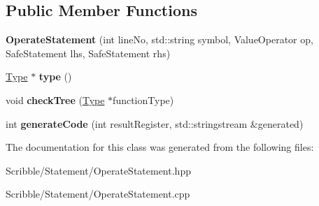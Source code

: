 \subsection*{Public Member Functions}
\begin{DoxyCompactItemize}
\item 
\hypertarget{class_operate_statement_a850e8e5d58fcb6eb679964d77e1b0efc}{{\bfseries Operate\-Statement} (int line\-No, std\-::string symbol, Value\-Operator op, Safe\-Statement lhs, Safe\-Statement rhs)}\label{class_operate_statement_a850e8e5d58fcb6eb679964d77e1b0efc}

\item 
\hypertarget{class_operate_statement_a70829f6c2c259ecb90e04334fc084173}{\hyperlink{class_type}{Type} $\ast$ {\bfseries type} ()}\label{class_operate_statement_a70829f6c2c259ecb90e04334fc084173}

\item 
\hypertarget{class_operate_statement_a690aba01823c509664d6cf1cb4bc0b14}{void {\bfseries check\-Tree} (\hyperlink{class_type}{Type} $\ast$function\-Type)}\label{class_operate_statement_a690aba01823c509664d6cf1cb4bc0b14}

\item 
\hypertarget{class_operate_statement_ae2403856c0521666a2318bd80c8f3a09}{int {\bfseries generate\-Code} (int result\-Register, std\-::stringstream \&generated)}\label{class_operate_statement_ae2403856c0521666a2318bd80c8f3a09}

\end{DoxyCompactItemize}


The documentation for this class was generated from the following files\-:\begin{DoxyCompactItemize}
\item 
Scribble/\-Statement/Operate\-Statement.\-hpp\item 
Scribble/\-Statement/Operate\-Statement.\-cpp\end{DoxyCompactItemize}
